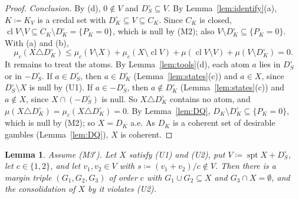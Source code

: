 \documentclass[11pt]{article}
\DeclareMathOperator{\cl}{cl}
\DeclareMathOperator{\spt}{spt}
\theoremstyle{plain}
\newtheorem{lemma}[theorem]{Lemma}
\theoremstyle{definition}
\begin{document}
\begin{proof}
\emph{Conclusion.} By (d), $0\notin V$ and $D_S^\circ\subseteq V$. By
Lemma~\ref{lem:identify}(a), $K\coloneqq K_V$ is a credal set with $D_K^\circ\subseteq V\subseteq
C_K$. Since $C_K$ is closed, $\cl V\setminus V\subseteq C_K\setminus D_K^\circ=\{P_K=0\}$, which
is null by (M2); also $V\setminus D_K^\circ\subseteq\{P_K=0\}$. With (a) and (b),
\[
  \mu_c(X\triangle D_K^\circ)\le\mu_c(V\setminus X)+\mu_c(X\setminus\cl V)+\mu(\cl V\setminus V)+
  \mu(V\setminus D_K^\circ)=0 .
\]
It remains to treat the atoms. By Lemma~\ref{lem:tools}(d), each atom $a$ lies in $D_S^\circ$ or
in $-D_S^\circ$. If $a\in D_S^\circ$, then $a\in D_K^\circ$ (Lemma~\ref{lem:states}(c)) and $a\in
X$, since $D_S^\circ\setminus X$ is null by (U1). If $a\in-D_S^\circ$, then $a\notin D_K^\circ$
(Lemma~\ref{lem:states}(c)) and $a\notin X$, since $X\cap(-D_S^\circ)$ is null. So $X\triangle
D_K^\circ$ contains no atom, and $\mu(X\triangle D_K^\circ)=\mu_c(X\triangle D_K^\circ)=0$. By
Lemma~\ref{lem:DQ}, $D_K\setminus D_K^\circ\subseteq\{P_K=0\}$, which is null by (M2); so $X=D_K$
a.e. As $D_K$ is a coherent set of desirable gambles (Lemma~\ref{lem:DQ}), $X$ is coherent.
\end{proof}

\begin{lemma}\label{lem:gap}
Assume (M3$'$). Let $X$ satisfy (U1) and (U2), put $V\coloneqq\spt X+D_S^\circ$, let $c\in\{1,2\}$,
and let $v_1,v_2\in V$ with $s\coloneqq(v_1+v_2)/c\notin V$. Then there is a margin triple
$(G_1,G_2,G_3)$ of order $c$ with $G_1\cup G_2\subseteq X$ and $G_3\cap X=\emptyset$, and the
consolidation of $X$ by it violates (U2).
\end{lemma}
\end{document}
